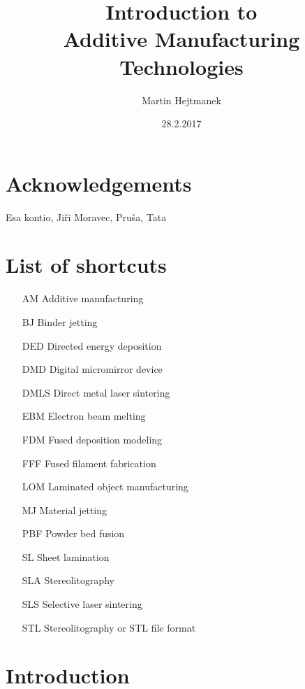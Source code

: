 \documentclass[a4paper, twoside, 11pt]{report}
\begin{document}
%
\begin{titlepage}
\title{Introduction to\\Additive Manufacturing Technologies}
\author{Martin Hejtmanek}
\date{28.2.2017}
\maketitle
\end{titlepage}
%
\chapter*{Acknowledgements}
Esa kontio, Jiři Moravec, Pruša, Tata

\tableofcontents

\chapter*{List of shortcuts}
\begin{itemize}
\item[AM]Additive manufacturing
\item[BJ]Binder jetting
\item[DED]Directed energy deposition
\item[DMD]Digital micromirror device
\item[DMLS]Direct metal laser sintering
\item[EBM]Electron beam melting
\item[FDM]Fused deposition modeling
\item[FFF]Fused filament fabrication
\item[LOM]Laminated object manufacturing
\item[MJ]Material jetting
\item[PBF]Powder bed fusion
\item[SL]Sheet lamination
\item[SLA]Stereolitography
\item[SLS]Selective laser sintering
\item[STL]Stereolitography or STL file format
\end{itemize}


\chapter{Introduction}
%
%
%
\end{document}
